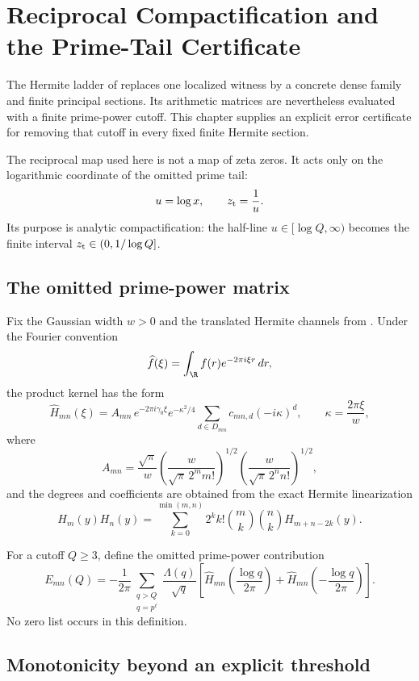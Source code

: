 \chapter{Reciprocal Compactification and the Prime-Tail Certificate}
\label{ch:prime-tail-certificate}

The Hermite ladder of  replaces one
localized witness by a concrete dense family and finite principal sections.
Its arithmetic matrices are nevertheless evaluated with a finite prime-power
cutoff. This chapter supplies an explicit error certificate for removing that
cutoff in every fixed finite Hermite section.

The reciprocal map used here is not a map of zeta zeros. It acts only on the
logarithmic coordinate of the omitted prime tail:
\[
 u=\log x,
 \qquad
 z_{\rm t}=\frac1u.
\]
Its purpose is analytic compactification: the half-line
$u\in[\log Q,\infty)$ becomes the finite interval
$z_{\rm t}\in(0,1/\log Q]$.

\section{The omitted prime-power matrix}

Fix the Gaussian width $w>0$ and the translated Hermite channels from
. Under the Fourier convention
\[
 \widehat f(\xi)
 =
 \int_{\R} f(r)e^{-2\pi i\xi r}\,dr,
\]
the product kernel has the form
\[
 \widehat H_{mn}(\xi)
 =
 A_{mn}\,
 e^{-2\pi i\gamma_0\xi}
 e^{-\kappa^2/4}
 \sum_{d\in D_{mn}} c_{mn,d}(-i\kappa)^d,
 \qquad
 \kappa=\frac{2\pi\xi}{w},
\]
where
\[
 A_{mn}
 =
 \frac{\sqrt{\pi}}{w}
 \left(
 \frac{w}{\sqrt{\pi}\,2^m m!}
 \right)^{1/2}
 \left(
 \frac{w}{\sqrt{\pi}\,2^n n!}
 \right)^{1/2},
\]
and the degrees and coefficients are obtained from the exact Hermite
linearization
\[
 H_m(y)H_n(y)
 =
 \sum_{k=0}^{\min(m,n)}
 2^k k!\binom{m}{k}\binom{n}{k}
 H_{m+n-2k}(y).
\]

For a cutoff $Q\ge3$, define the omitted prime-power contribution
\[
 E_{mn}(Q)
 =
 -\frac1{2\pi}
 \sum_{\substack{q>Q\\q=p^\ell}}
 \frac{\Lambda(q)}{\sqrt q}
 \left[
 \widehat H_{mn}\!\left(\frac{\log q}{2\pi}\right)
 +
 \widehat H_{mn}\!\left(-\frac{\log q}{2\pi}\right)
 \right].
\]
No zero list occurs in this definition.

\section{Monotonicity beyond an explicit threshold}

